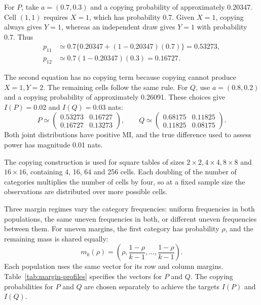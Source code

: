 \begin{samepage}
\medskip
{}

For \(P\), take \(a=(0.7,0.3)\) and a copying probability of
approximately 0.20347. Cell \((1,1)\) requires \(X=1\), which has
probability 0.7. Given \(X=1\), copying always gives \(Y=1\), whereas
an independent draw gives \(Y=1\) with probability 0.7. Thus
\begin{align*}
 p_{11}&\simeq0.7\{0.20347+(1-0.20347)(0.7)\}=0.53273,\\
 p_{12}&\simeq0.7(1-0.20347)(0.3)=0.16727.
\end{align*}
\end{samepage}
The second equation has no copying term because copying cannot produce
\(X=1,Y=2\). The remaining cells follow the same rule.
For \(Q\), use \(a=(0.8,0.2)\) and a copying probability of approximately
0.26091. These choices give \(I(P)=0.02\) and \(I(Q)=0.03\) nats:
\begin{equation}
 P\simeq\begin{pmatrix}0.53273&0.16727\\0.16727&0.13273\end{pmatrix},
 \qquad
 Q\simeq\begin{pmatrix}0.68175&0.11825\\0.11825&0.08175\end{pmatrix}.
 \label{eq:design-example-pair}
\end{equation}
Both joint distributions have positive MI, and the true difference used
to assess power has magnitude 0.01 nats.

\medskip
{}

The copying construction is used for square tables of sizes
\(2\times2,4\times4,8\times8\) and \(16\times16\), containing
4, 16, 64 and 256 cells. Each doubling of the number of categories
multiplies the number of cells by four, so at a fixed sample size the
observations are distributed over more possible cells.

Three margin regimes vary the category frequencies: uniform frequencies
in both populations, the same uneven frequencies in both, or different
uneven frequencies between them. For uneven margins, the first category
has probability \(\rho\), and the remaining mass is shared equally:
\begin{equation}
 m_k(\rho)=\left(\rho,\frac{1-\rho}{k-1},\ldots,
                   \frac{1-\rho}{k-1}\right).
 \label{eq:skew-margin}
\end{equation}
Each population uses the same vector for its row and column margins.
Table~\ref{tab:margin-profiles} specifies the vectors for \(P\) and \(Q\).
The copying probabilities for \(P\) and \(Q\) are chosen separately to
achieve the targets \(I(P)\) and \(I(Q)\).

